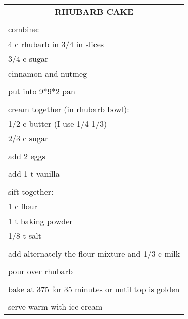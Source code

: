 \documentclass[8pt]{report}
\begin{document}
\begin{tabular}{|l|} \hline	%
 
\multicolumn{1}{|c|}{\textbf{RHUBARB CAKE}}
\\
\\

\index{desserts!rhubarb cake} \index{rhubarb cake}

combine:\\
\hspace{0.5 in}	4 c rhubarb in 3/4 in slices\\
\hspace{0.5 in}	3/4 c sugar\\
\hspace{0.5 in}	cinnamon and nutmeg\\
\\
put into 9*9*2 pan\\
\\
cream together (in rhubarb bowl):\\
\hspace{0.5 in}	1/2 c butter (I use 1/4-1/3)\\
\hspace{0.5 in}	2/3 c sugar\\
\\
add 2 eggs\\
\\
add 1 t vanilla\\
\\
sift together:\\
\hspace{0.5 in}	1 c flour\\
\hspace{0.5 in}	1 t baking powder\\
\hspace{0.5 in}	1/8 t salt\\
\\
add alternately the flour mixture and 1/3 c milk\\
\\
pour over rhubarb\\
\\
bake at 375 for 35 minutes or until top is golden\\
\\
serve warm with ice cream\\

\hline

\end{tabular}
\end{document}

